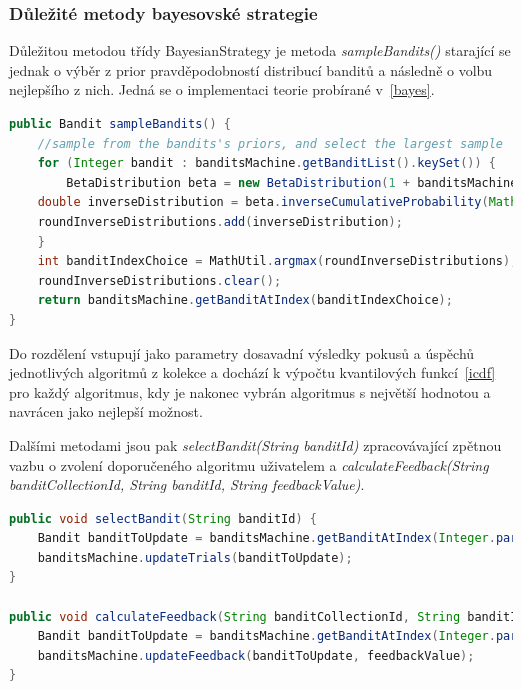\documentclass[thesis=M,czech]{FITthesis}[2014/05/07]
\begin{document}
\subsubsection{Důležité metody bayesovské strategie}
	Důležitou metodou třídy BayesianStrategy je metoda \emph{sampleBandits()} starající se jednak o výběr z prior pravděpodobností distribucí banditů a následně o volbu nejlepšího z nich. Jedná se o implementaci teorie probírané v~\ref{bayes}.
	
\begin{lstlisting}[language=java]
public Bandit sampleBandits() {
    //sample from the bandits's priors, and select the largest sample
    for (Integer bandit : banditsMachine.getBanditList().keySet()) {
        BetaDistribution beta = new BetaDistribution(1 + banditsMachine.getBanditAtIndex(bandit).getSuccesses(), 1 + banditsMachine.getBanditAtIndex(bandit).getTrials() - banditsMachine.getBanditAtIndex(bandit).getSuccesses());
    double inverseDistribution = beta.inverseCumulativeProbability(Math.random());
    roundInverseDistributions.add(inverseDistribution);
    }
    int banditIndexChoice = MathUtil.argmax(roundInverseDistributions);
    roundInverseDistributions.clear();
    return banditsMachine.getBanditAtIndex(banditIndexChoice);
}
\end{lstlisting}	

Do rozdělení vstupují jako parametry dosavadní výsledky pokusů a úspěchů jednotlivých algoritmů z kolekce a dochází k výpočtu kvantilových funkcí~\ref{icdf} pro každý algoritmus, kdy je nakonec vybrán algoritmus s největší hodnotou a navrácen jako nejlepší možnost. 

Dalšími metodami jsou pak \emph{selectBandit(String banditId)} zpracovávající zpětnou vazbu o zvolení doporučeného algoritmu uživatelem a \emph{calculateFeedback(String banditCollectionId, String banditId, String feedbackValue)}. 

\begin{lstlisting}[language=java]
public void selectBandit(String banditId) {
    Bandit banditToUpdate = banditsMachine.getBanditAtIndex(Integer.parseInt(banditId));        
    banditsMachine.updateTrials(banditToUpdate);           
}

public void calculateFeedback(String banditCollectionId, String banditId, String feedbackValue) {
    Bandit banditToUpdate = banditsMachine.getBanditAtIndex(Integer.parseInt(banditId));
    banditsMachine.updateFeedback(banditToUpdate, feedbackValue);   
}  
\end{lstlisting}	
\end{document}
